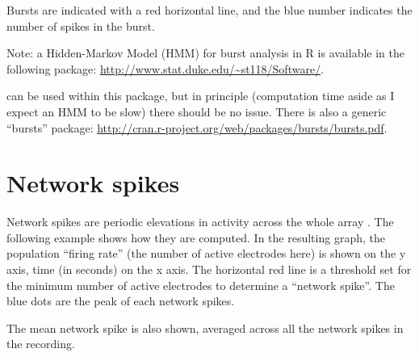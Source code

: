 \documentclass{article}\usepackage[]{graphicx}\usepackage[]{color}
\begin{document}
Bursts are indicated with a red horizontal line, and the blue number
indicates the number of spikes in the burst.


Note: a Hidden-Markov Model (HMM) for burst analysis in R \citep{Tokdar2010}
is available in the following package:
\url{http://www.stat.duke.edu/~st118/Software/}.

can be used within this package, but in principle (computation time
aside as I expect an HMM to be slow) there should be no issue.  There
is also a generic ``bursts'' package:
\url{http://cran.r-project.org/web/packages/bursts/bursts.pdf}.



\section*{Network spikes}

Network spikes are periodic elevations in activity across the whole
array \citep{Eytan2006}.  The following example shows how they are computed.
In the resulting graph, the population ``firing rate'' (the number of
active electrodes here) is shown on the y axis, time (in seconds) on
the x axis.  The horizontal red line is a threshold set for the
minimum number of active electrodes to determine a ``network spike''.
The blue dots are the peak of each network spikes.

The mean network spike is also shown, averaged across all the network
spikes in the recording.
\end{document}
